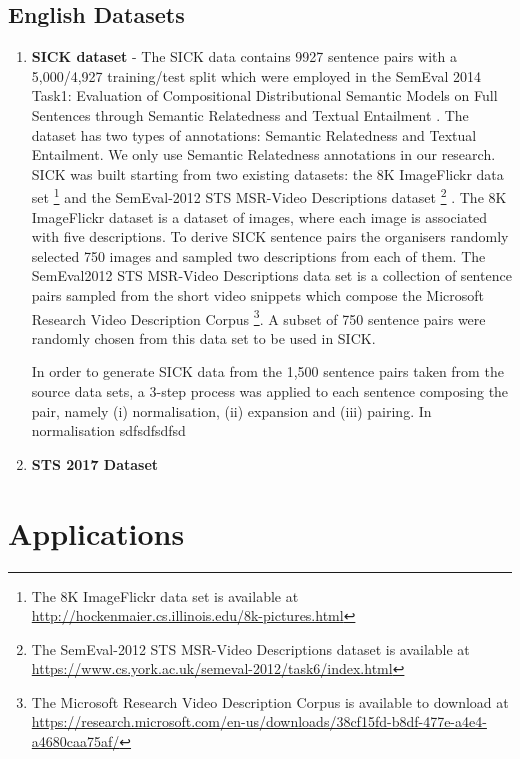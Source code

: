 \subsection{English Datasets}
\begin{enumerate}
  \item \textbf{SICK dataset} - The SICK data contains 9927 sentence pairs with a 5,000/4,927 training/test split which were employed in the SemEval 2014 Task1: Evaluation of Compositional Distributional Semantic Models on Full Sentences through Semantic Relatedness and Textual Entailment \cite{marelli-etal-2014-semeval}. The dataset has two types of annotations: Semantic Relatedness and Textual Entailment. We only use Semantic Relatedness annotations in our research. SICK was built starting from two existing datasets: the 8K ImageFlickr data set \footnote{The 8K ImageFlickr data set is available at \url{http://hockenmaier.cs.illinois.edu/8k-pictures.html}} \cite{rashtchian-etal-2010-collecting} and the SemEval-2012 STS MSR-Video Descriptions dataset \footnote{The SemEval-2012 STS MSR-Video Descriptions dataset is available at \url{https://www.cs.york.ac.uk/semeval-2012/task6/index.html}} \cite{agirre-etal-2012-semeval}. The 8K ImageFlickr dataset is a dataset of images, where each image is associated with five descriptions. To derive SICK sentence pairs the organisers randomly selected 750 images and sampled two descriptions from each of them. The SemEval2012 STS MSR-Video Descriptions data set is a collection of sentence pairs sampled from the short video snippets which compose the Microsoft Research Video Description Corpus \footnote{The Microsoft Research Video Description Corpus is available to download at \url{https://research.microsoft.com/en-us/downloads/38cf15fd-b8df-477e-a4e4-a4680caa75af/}}. A subset of 750 sentence pairs were randomly chosen from this data set to be used in SICK. 
  
  In order to generate SICK data from the 1,500 sentence pairs taken from the source data sets, a 3-step process was applied to each sentence composing the pair, namely (i) normalisation, (ii) expansion and (iii) pairing. In normalisation sdfsdfsdfsd 
  
  \item \textbf{STS 2017 Dataset}
  
\end{enumerate}

\section{Applications}


